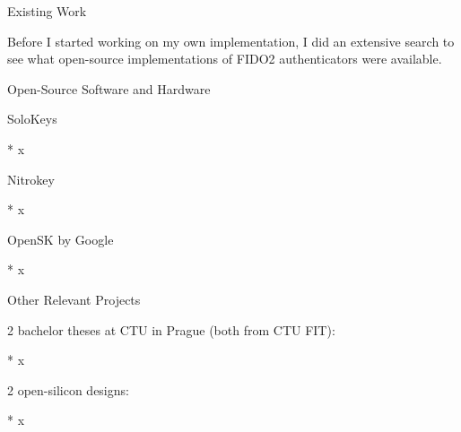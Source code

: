  Existing Work

Before I started working on my own implementation, I did an extensive search to see what open-source implementations of FIDO2 authenticators were available.


\sec[oss] Open-Source Software and Hardware


\secc[solo] SoloKeys

\begitems

* x

\enditems


\secc[solo] Nitrokey

\begitems

* x

\enditems


\secc[solo] OpenSK by Google

\begitems

* x

\enditems


\sec[oss] Other Relevant Projects

2 bachelor theses at CTU in Prague (both from CTU FIT):

\begitems

* x

\enditems

2 open-silicon designs:

\begitems

* x

\enditems
